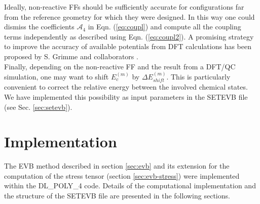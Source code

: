 Ideally, non-reactive FFs should be sufficiently accurate for configurations far from the reference geometry for which they were designed. In this way one could dismiss the coefficients $\mathcal{A}_{4}$ in Eqn. (\ref{eq:coupl}) and compute all the coupling terms independently as described using Eqn. (\ref{eq:coupl2}). A promising strategy to improve the accuracy of available potentials from DFT calculations has been proposed by S. Grimme and collaborators \cite{grimme2014,grimme2017}.\\
Finally, depending on the non-reactive FF and the result from a DFT/QC simulation, one may want to shift  $E^{(m)}_{c}$ by $\Delta E^{(m)}_{shift}$. This is particularly convenient to correct the relative energy between the involved chemical states. We have implemented this possibility as input parameters in the SETEVB file (see Sec. \ref{sec:setevb}).

\section{Implementation}\label{sec:implement}

The EVB method described in section \ref{sec:evb} and its extension for the computation of the stress tensor (section \ref{sec:evb-stress}) were implemented within the DL\_POLY\_4 code. Details of the computational implementation and the structure of the SETEVB file are presented in the following sections.

